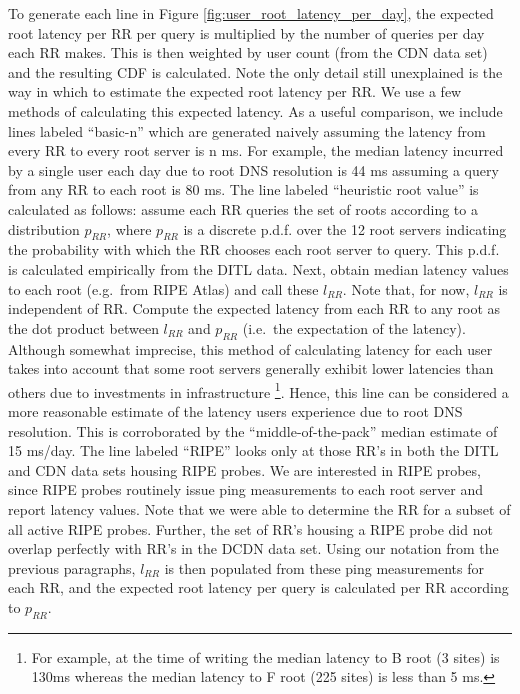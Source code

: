 \documentclass[sigconf,nonacm,10pt]{acmart}
\begin{document}
To generate each line in Figure \ref{fig:user_root_latency_per_day}, the
expected root latency per RR per query is multiplied by the number of
queries per day each RR makes. This is then weighted by user count (from
the CDN data set) and the resulting CDF is calculated. Note the only
detail still unexplained is the way in which to estimate the expected
root latency per RR. \break \break
We use a few methods of calculating this expected latency. As a useful
comparison, we include lines labeled ``basic-n'' which are generated
naively assuming the latency from every RR to every root server is n ms.
For example, the median latency incurred by a single user each day due
to root DNS resolution is 44 ms assuming a query from any RR to each
root is 80 ms. \break \break
The line labeled ``heuristic root value'' is calculated as follows:
assume each RR queries the set of roots according to a distribution
\(p_{RR}\), where \(p_{RR}\) is a discrete p.d.f. over the 12 root
servers indicating the probability with which the RR chooses each root
server to query. This p.d.f. is calculated empirically from the DITL
data. Next, obtain median latency values to each root (e.g.~from RIPE
Atlas) and call these \(l_{RR}\). Note that, for now, \(l_{RR}\) is
independent of RR. Compute the expected latency from each RR to any root
as the dot product between \(l_{RR}\) and \(p_{RR}\) (i.e.~the
expectation of the latency). Although somewhat imprecise, this method of
calculating latency for each user takes into account that some root
servers generally exhibit lower latencies than others due to investments
in infrastructure
\footnote{ For example, at the time of writing the median latency to B root (3 sites) is 130ms whereas the median latency to F root  (225 sites) is less than 5 ms. }.
Hence, this line can be considered a more reasonable estimate of the
latency users experience due to root DNS resolution. This is
corroborated by the ``middle-of-the-pack'' median estimate of 15 ms/day.
\break \break
The line labeled ``RIPE'' looks only at those RR's in both the DITL and
CDN data sets housing RIPE probes. We are interested in RIPE probes,
since RIPE probes routinely issue ping measurements to each root server
and report latency values. Note that we were able to determine the RR
for a subset of all active RIPE probes. Further, the set of RR's housing
a RIPE probe did not overlap perfectly with RR's in the DCDN data set.
Using our notation from the previous paragraphs, \(l_{RR}\) is then
populated from these ping measurements for each RR, and the expected
root latency per query is calculated per RR according to \(p_{RR}\).
\end{document}
